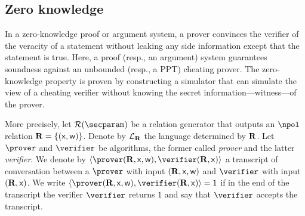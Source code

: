 \documentclass[runningheads,11pt]{llncs}
\theoremstyle{definition}
\begin{document}
\subsection{Zero knowledge}
In a zero-knowledge proof or argument system, a prover convinces the verifier of the veracity of a statement without leaking any side information except that the statement is true.
Here, a proof (resp., an argument) system guarantees soundness against an unbounded (resp., a PPT) cheating prover.
The zero-knowledge property is proven by constructing a simulator that can simulate the view of a cheating verifier without knowing the secret information---witness---of the prover.

More precisely, let $\RELGEN(\secparam)$ be a relation generator that outputs an $\npol$ relation $\mathbf{R} = \{(\mathsf{x}, \mathsf{w})\}$.  Denote by $\mathcal{L}_{\mathbf{R}}$ the language determined by $\mathbf{R}$.
Let $\prover$ and $\verifier$ be algorithms, the former called \emph{prover} and the latter \emph{verifier}.
We denote by $\ip{\prover(\REL, \inp, \wit)}{\verifier(\REL, \inp)}$ a transcript of conversation between a $\prover$ with input $(\mathbf{R}, \mathsf{x}, \mathsf{w})$ and $\verifier$ with input $(\mathbf{R}, \mathsf{x})$.
We write $\ip{\prover (\REL, \inp, \wit)}{\verifier(\REL, \inp)} = 1$ if in the end of the transcript the verifier $\verifier$ returns $1$ and say that $\verifier$ accepts the transcript.
\end{document}
